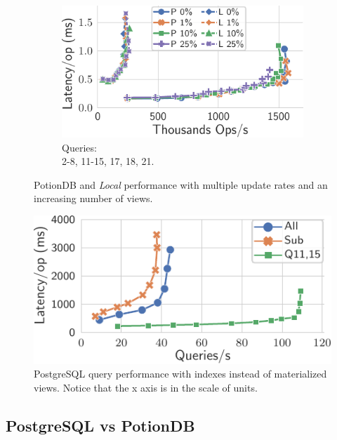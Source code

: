 \documentclass[sigplan,twocolumn,review,anonymous]{acmart}
\begin{document}
\begin{figure}
\begin{minipage}{.58\linewidth}
\begin{subfigure}{.32\linewidth}
		\includegraphics[width=1\linewidth]{queryScale/15Ops}
		\caption{Queries:\\\hspace{\textwidth} 2-8, 11-15, 17, 18, 21.}
		\label{fig:15Q}
	\end{subfigure}%
	\vspace*{-0.65em}
	\caption{PotionDB and \emph{Local}  performance with multiple update rates and an increasing number of views.}
	\label{fig:queryScaleUpds}
	\vspace*{-0.2em}
	\end{minipage}%
	\hspace*{0.05\linewidth}
	\begin{minipage}{.34\linewidth}
		\centering
		\includegraphics[width=0.8\linewidth]{postgres/postgresNoView}
		\caption{PostgreSQL query performance with indexes instead of materialized views. Notice that the x axis is in the scale of units.}
		\label{fig:postgresNoViews}
	\end{minipage}
\end{figure}

\subsection{PostgreSQL vs PotionDB}\label{sec:eval:postgrs}
\end{document}
